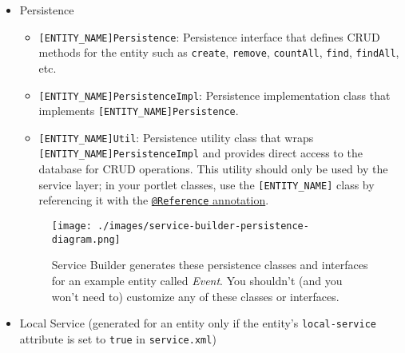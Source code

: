 \begin{itemize}
\tightlist
\item
  Persistence

  \begin{itemize}
  \tightlist
  \item
    \texttt{{[}ENTITY\_NAME{]}Persistence}: Persistence interface that
    defines CRUD methods for the entity such as \texttt{create},
    \texttt{remove}, \texttt{countAll}, \texttt{find}, \texttt{findAll},
    etc.
  \item
    \texttt{{[}ENTITY\_NAME{]}PersistenceImpl}: Persistence
    implementation class that implements
    \texttt{{[}ENTITY\_NAME{]}Persistence}.
  \item
    \texttt{{[}ENTITY\_NAME{]}Util}: Persistence utility class that
    wraps \texttt{{[}ENTITY\_NAME{]}PersistenceImpl} and provides direct
    access to the database for CRUD operations. This utility should only
    be used by the service layer; in your portlet classes, use the
    \texttt{{[}ENTITY\_NAME{]}} class by referencing it with the
    \href{/docs/7-2/frameworks/-/knowledge_base/f/declarative-services}{\texttt{@Reference}
    annotation}.
  \end{itemize}

  \begin{figure}
  \centering
  \texttt{[image: ./images/service-builder-persistence-diagram.png]}
  \caption{Service Builder generates these persistence classes and
  interfaces for an example entity called \emph{Event}. You shouldn't
  (and you won't need to) customize any of these classes or interfaces.}
  \end{figure}
\item
  Local Service (generated for an entity only if the entity's
  \texttt{local-service} attribute is set to \texttt{true} in
  \texttt{service.xml})


\end{itemize}
